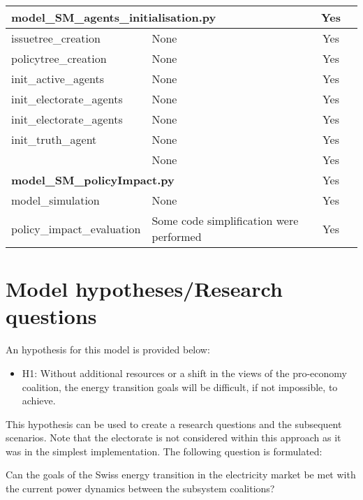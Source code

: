 \documentclass[12pt]{article}
\begin{document}
\begin{longtable}{|l|p{6cm}|c|c|}
\multicolumn{2}{|l|}{{\bfseries model\_SM\_agents\_initialisation.py}}
									& Yes	\\ \hline
issuetree\_creation			& None		& Yes	\\ \hline
policytree\_creation			& None		& Yes	\\ \hline
init\_active\_agents			& None		& Yes	\\ \hline
init\_electorate\_agents		& None		& Yes	\\ \hline
init\_electorate\_agents		& None		& Yes	\\ \hline
init\_truth\_agent			& None		& Yes	\\ \hline
						& None		& Yes	\\ \hline
\multicolumn{2}{|l|}{{\bfseries model\_SM\_policyImpact.py}}
									& Yes	\\ \hline
model\_simulation			& None		& Yes	\\ \hline
policy\_impact\_evaluation	& Some code simplification were performed
									& Yes	\\ \hline
	
\end{longtable}


\section{Model hypotheses/Research questions}
\label{sec:hypotheses}

An hypothesis for this model is provided below:

\begin{itemize}
\item H1: Without additional resources or a shift in the views of the pro-economy coalition, the energy transition goals will be difficult, if not impossible, to achieve.
\end{itemize}

This hypothesis can be used to create a research questions and the subsequent scenarios. Note that the electorate is not considered within this approach as it was in the simplest implementation. The following question is formulated:

Can the goals of the Swiss energy transition in the electricity market be met with the current power dynamics between the subsystem coalitions?

\end{document}
